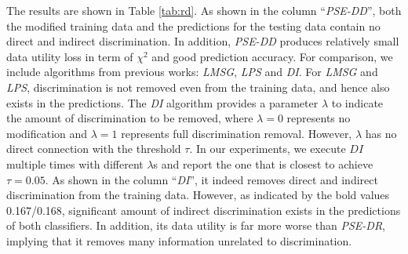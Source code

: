 \documentclass[letterpaper]{article}
\begin{document}
The results are shown in Table \ref{tab:rd}. As shown in the column ``\emph{PSE-DD}'', both the modified training data and the predictions for the testing data contain no direct and indirect discrimination. In addition, \emph{PSE-DD} produces relatively small data utility loss in term of $\chi^2$ and good prediction accuracy. For comparison, we include algorithms from previous works: \emph{LMSG}, \emph{LPS} and \emph{DI}. For \emph{LMSG} and \emph{LPS}, discrimination is not removed even from the training data, and hence also exists in the predictions. The \emph{DI} algorithm provides a parameter $\lambda$ to indicate the amount of discrimination to be removed, where $\lambda=0$ represents no modification and $\lambda=1$ represents full discrimination removal. However, $\lambda$ has no direct connection with the threshold $\tau$. In our experiments, we execute $DI$ multiple times with different $\lambda$s and report the one that is closest to achieve $\tau=0.05$. As shown in the column ``\emph{DI}'', it indeed removes direct and indirect discrimination from the training data. However, as indicated by the bold values 0.167/0.168, significant amount of indirect discrimination exists in the predictions of both classifiers. In addition, its data utility is far more worse than \emph{PSE-DR}, implying that it removes many information unrelated to discrimination.

\end{document}
